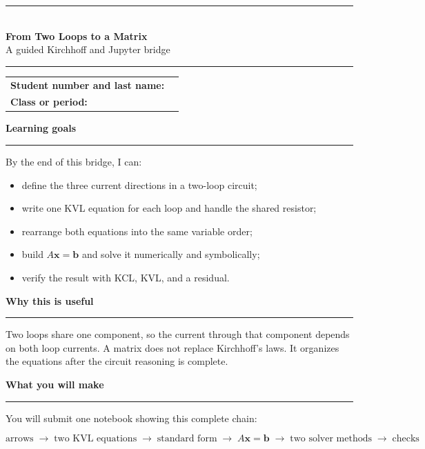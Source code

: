 \documentclass[10pt,letterpaper]{article}
\newcommand{\sectiontitle}[1]{%
  {\color{TEJOrange}\Large\bfseries #1}\par
  {\color{TEJRule}\rule{\linewidth}{1.1pt}}\vspace{4pt}
}
\begin{document}
\color{TEJNavy}

\begin{center}
  {\color{TEJOrange}\rule{\linewidth}{3pt}}\\[13pt]
  {\fontsize{28}{32}\selectfont\bfseries From Two Loops to a Matrix}\\[7pt]
  {\Large A guided Kirchhoff and Jupyter bridge}\\[10pt]
  {\color{TEJOrange}\rule{0.72\linewidth}{2pt}}
\end{center}

\vspace{8pt}
\begin{tabularx}{\linewidth}{@{}>{\bfseries}l X@{}}
Student number and last name: & \hrulefill \\[8pt]
Class or period: & \hrulefill \\
\end{tabularx}

\sectiontitle{Learning goals}

By the end of this bridge, I can:
\begin{itemize}
  \item define the three current directions in a two-loop circuit;
  \item write one KVL equation for each loop and handle the shared resistor;
  \item rearrange both equations into the same variable order;
  \item build $A\mathbf{x}=\mathbf{b}$ and solve it numerically and symbolically;
  \item verify the result with KCL, KVL, and a residual.
\end{itemize}

\sectiontitle{Why this is useful}

Two loops share one component, so the current through that component depends on both loop currents. A matrix does not replace Kirchhoff's laws. It organizes the equations after the circuit reasoning is complete.

\sectiontitle{What you will make}

You will submit one notebook showing this complete chain:

\[
\boxed{\text{arrows}}\;\longrightarrow\;
\boxed{\text{two KVL equations}}\;\longrightarrow\;
\boxed{\text{standard form}}\;\longrightarrow\;
\boxed{A\mathbf{x}=\mathbf{b}}\;\longrightarrow\;
\boxed{\text{two solver methods}}\;\longrightarrow\;
\boxed{\text{checks}}
\]
\end{document}
